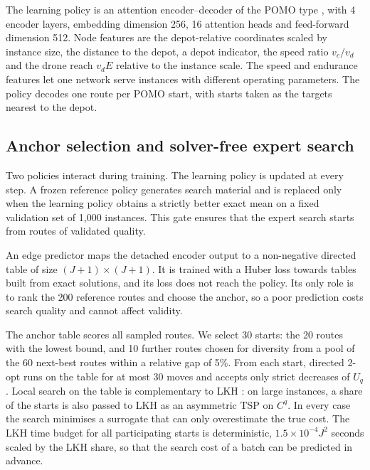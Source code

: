 \documentclass[preprint,12pt,authoryear]{elsarticle}
\begin{document}
The learning policy is an attention encoder--decoder of the POMO type \citep{kwon2020}, with 4 encoder layers, embedding dimension 256, 16 attention heads and feed-forward dimension 512. Node features are the depot-relative coordinates scaled by instance size, the distance to the depot, a depot indicator, the speed ratio $v_{c}/v_{d}$ and the drone reach $v_{d}E$ relative to the instance scale. The speed and endurance features let one network serve instances with different operating parameters. The policy decodes one route per POMO start, with starts taken as the targets nearest to the depot.

\subsection{Anchor selection and solver-free expert search}

Two policies interact during training. The learning policy is updated at every step. A frozen reference policy generates search material and is replaced only when the learning policy obtains a strictly better exact mean on a fixed validation set of 1,000 instances. This gate ensures that the expert search starts from routes of validated quality.

An edge predictor maps the detached encoder output to a non-negative directed table of size $(J+1) \times (J+1)$. It is trained with a Huber loss towards tables built from exact solutions, and its loss does not reach the policy. Its only role is to rank the 200 reference routes and choose the anchor, so a poor prediction costs search quality and cannot affect validity.

The anchor table scores all sampled routes. We select 30 starts: the 20 routes with the lowest bound, and 10 further routes chosen for diversity from a pool of the 60 next-best routes within a relative gap of 5\%. From each start, directed 2-opt runs on the table for at most 30 moves and accepts only strict decreases of $U_{q}$. Local search on the table is complementary to LKH \citep{lin1973,helsgaun2000}: on large instances, a share of the starts is also passed to LKH as an asymmetric TSP on $C^{q}$. In every case the search minimises a surrogate that can only overestimate the true cost. The LKH time budget for all participating starts is deterministic, $1.5 \times 10^{-4} J^{2}$ seconds scaled by the LKH share, so that the search cost of a batch can be predicted in advance.
\end{document}
